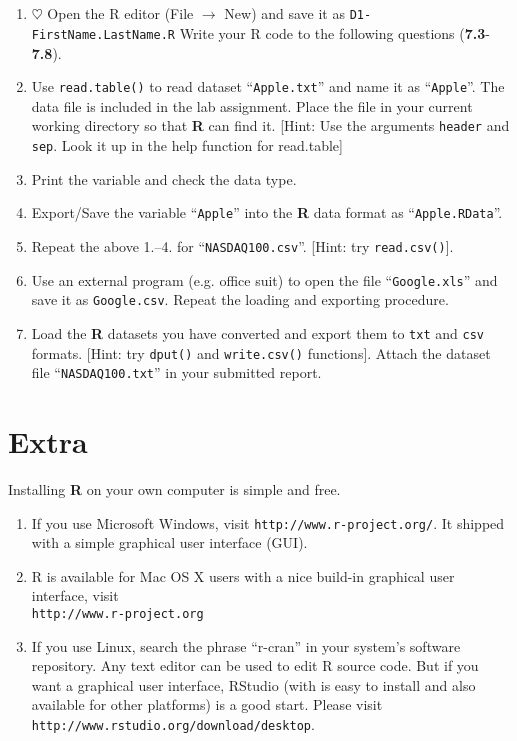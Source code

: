 \documentclass[a4paper]{article}
\begin{document}
\section{}
\begin{enumerate}
\item $\heartsuit$ Open the R editor (File $\to$ New) and save it as
  \texttt{D1-FirstName.LastName.R} Write your R code to the following questions (\textbf{7.3}-\textbf{7.8}).
\item Use \texttt{read.table()} to read dataset ``\texttt{Apple.txt}'' and name it as
  ``\texttt{Apple}''. The data file is included in the lab assignment. Place
  the file in your current working directory so that \textbf{R} can find it. [Hint: Use
 the arguments \texttt{header} and \texttt{sep}. Look it up in the help function for read.table]
\item Print the variable and check the data type.
\item Export/Save the variable ``\texttt{Apple}'' into the \textbf{R} data format as ``\texttt{Apple.RData}''.
\item Repeat the above 1.--4. for ``\texttt{NASDAQ100.csv}''. [Hint: try \texttt{read.csv()}].
\item Use an external program (e.g. office suit) to open the file
  ``\texttt{Google.xls}'' and save it as \texttt{Google.csv}. Repeat the loading and
  exporting procedure.
\item Load the \textbf{R} datasets you have converted and export them to \texttt{txt}
  and \texttt{csv} formats. [Hint: try \texttt{dput()} and \texttt{write.csv()}
  functions]. Attach the dataset file ``\texttt{NASDAQ100.txt}'' in your submitted report.
\end{enumerate}

\section{Extra}
Installing \textbf{R} on your own computer is simple and free.
\begin{enumerate}
\item If you use Microsoft Windows, visit
  \texttt{http://www.r-project.org/}. It shipped with a
  simple graphical user interface (GUI).
\item R is available for Mac OS X users with a nice build-in graphical user interface, visit \\
\texttt{http://www.r-project.org}
\item If you use Linux, search the phrase ``r-cran'' in your system's software
  repository. Any text editor can be used to edit R source code. But if you
  want a graphical user interface, RStudio (with is easy to install and also available for other
  platforms) is a good start. Please visit \texttt{http://www.rstudio.org/download/desktop}.

\end{enumerate}
\end{document}
